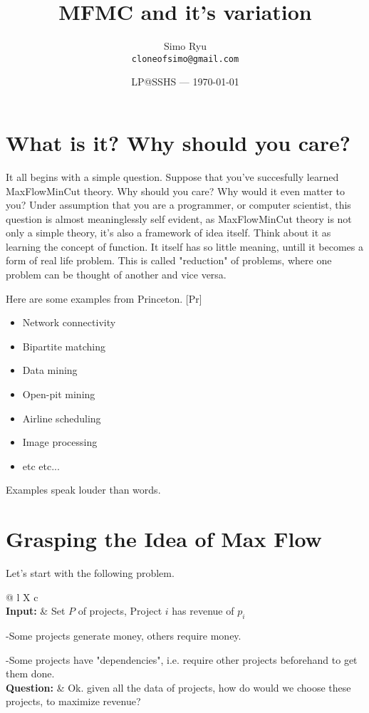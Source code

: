 \documentclass[12pt]{article}
\title{MFMC and it's variation} %
\author{Simo Ryu\\ \texttt{cloneofsimo@gmail.com}} %
\date{LP@SSHS --- \today} %
\begin{document}
\maketitle %

\section{What is it? Why should you care?}

It all begins with a simple question. Suppose that you've succesfully learned MaxFlowMinCut theory. Why should you care? Why would it even matter to you? Under assumption that you are a programmer, or computer scientist, this question is almost meaninglessly self evident, as MaxFlowMinCut theory is not only a simple theory, it's also a framework of idea itself. Think about it as learning the concept of function. It itself has so little meaning, untill it becomes a form of real life problem. This is called "reduction" of problems, where one problem can be thought of another and vice versa.

Here are some examples from Princeton. [Pr]
\begin{itemize}
  \item Network connectivity
  \item Bipartite matching
  \item Data mining
  \item Open-pit mining
  \item Airline scheduling
  \item Image processing
  \item etc etc...
\end{itemize}

Examples speak louder than words.

\section{Grasping the Idea of Max Flow}
Let's start with the following problem.

\begin{tabularx}{\textwidth}{@{\hspace{\parindent}} l X c}
    \\%
   \textbf{Input:} & Set $P$ of projects, Project $i$ has revenue of $p_i$

   -Some projects generate money, others require money.

   -Some projects have "dependencies", i.e. require other projects beforehand to get them done.\\%
   \textbf{Question:} & Ok. given all the data of projects, how do would we choose these projects, to maximize revenue?%
 \end{tabularx}
\end{document}
